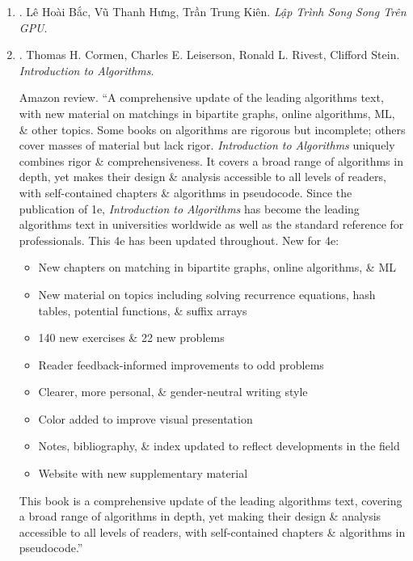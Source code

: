\documentclass{article}
\begin{document}
\begin{enumerate}
	\item \cite{Bac_Hung_Kien_parallel_programming}. {\sc Lê Hoài Bắc, Vũ Thanh Hưng, Trần Trung Kiên}. {\it Lập Trình Song Song Trên GPU}.\hfill{\sf[done]}

	\item \cite{Cormen_Leiserson_Rivest_Stein_algorithm}. {\sc Thomas H. Cormen, Charles E. Leiserson,  Ronald L. Rivest, Clifford Stein}. {\it Introduction to Algorithms}. {}

	{\sf Amazon review.} ``A comprehensive update of the leading algorithms text, with new material on matchings in bipartite graphs, online algorithms, ML, \& other topics. Some books on algorithms are rigorous but incomplete; others cover masses of material but lack rigor. {\it Introduction to Algorithms} uniquely combines rigor \& comprehensiveness. It covers a broad range of algorithms in depth, yet makes their design \& analysis accessible to all levels of readers, with self-contained chapters \& algorithms in pseudocode. Since the publication of 1e, {\it Introduction to Algorithms} has become the leading algorithms text in universities worldwide as well as the standard reference for professionals. This 4e has been updated throughout. New for 4e:
	\begin{itemize}
		\item New chapters on matching in bipartite graphs, online algorithms, \& ML
		\item New material on topics including solving recurrence equations, hash tables, potential functions, \& suffix arrays
		\item 140 new exercises \& 22 new problems
		\item Reader feedback-informed improvements to odd problems
		\item Clearer, more personal, \& gender-neutral writing style
		\item Color added to improve visual presentation
		\item Notes, bibliography, \& index updated to reflect developments in the field
		\item Website with new supplementary material
	\end{itemize}
	This book is a comprehensive update of the leading algorithms text, covering a broad range of algorithms in depth, yet making their design \& analysis accessible to all levels of readers, with self-contained chapters \& algorithms in pseudocode.''
	\begin{itemize}

\end{itemize}
\end{enumerate}
\end{document}
